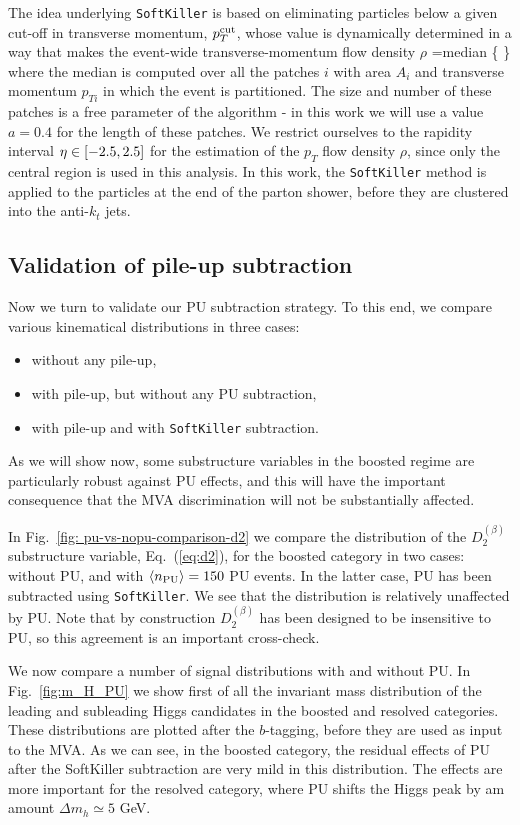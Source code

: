 The idea underlying {\tt SoftKiller} is based on eliminating particles
below a given cut-off in transverse momentum, $p_T^{\rm cut}$, whose
value is dynamically determined in a way that makes the event-wide
transverse-momentum flow density $\rho$
\be
\rho={\rm median} \Bigg\{ \Bigg\}
\ee
where the median is computed over all the patches $i$ with area
$A_i$ and transverse momentum $p_{Ti}$ in which the event is partitioned.
%
The size and number of these patches is a free parameter of the algorithm -
in this work we will use a value $a=0.4$ for the length of these
patches.
%
We restrict ourselves to the rapidity interval
$\eta \in \left[ -2.5, 2.5\right]$ for the estimation of the
$p_T$ flow density $\rho$, since only the central region
is used in this analysis.
%
In this work, the {\tt SoftKiller} method is applied
to the particles at the end of the parton shower, before
they are clustered into the anti-$k_t$ jets.


\subsection{Validation of pile-up subtraction}

Now we turn to validate our PU subtraction strategy.
%
To this end, we compare various kinematical distributions in three
cases:
\begin{itemize}
\item without any pile-up,
\item with pile-up, but without any PU subtraction,
  \item with pile-up and with {\tt SoftKiller} subtraction.
\end{itemize}
As we will show now, some substructure variables in the boosted
regime are particularly robust against PU effects, and this
will have the important consequence that the MVA discrimination
will not be substantially affected.


In Fig.~\ref{fig: pu-vs-nopu-comparison-d2} we
compare the distribution of the $D_2^{(\beta)}$
    substructure variable, Eq.~(\ref{eq:d2}), for the
    boosted category in two cases: without PU, and
    with $\left\langle n_{\rm PU}\right\rangle=150$ PU events.
    In the latter case, PU has been subtracted using
    {\tt SoftKiller}.
    We see that the distribution is relatively unaffected by PU.
    Note that by construction $D_2^{(\beta)}$ has been designed
    to be insensitive to PU, so this agreement is an important
    cross-check.

We now compare a number of signal distributions with
and without PU.
%
In Fig.~\ref{fig:m_H_PU} we show first of all the invariant mass distribution
of the leading and subleading Higgs candidates in the boosted
and resolved categories.
%
These distributions are plotted after the $b$-tagging,
before they are used as input to the MVA.
%
As we can see, in the boosted category, the residual effects of PU
after the SoftKiller subtraction are very mild in this
distribution.
%
The effects are more important for the resolved category, where PU
shifts the Higgs peak by am amount $\Delta m_h \simeq 5$ GeV.

